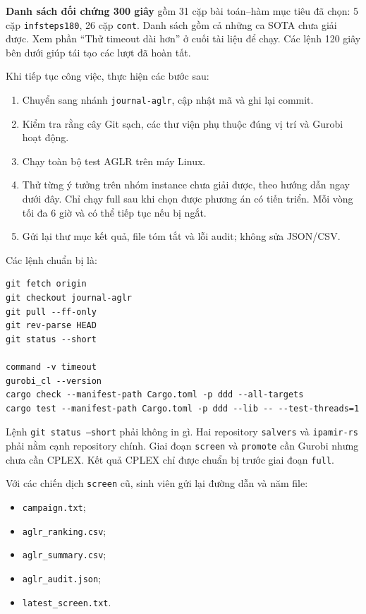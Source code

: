 \documentclass[11pt,a4paper]{article}
\newcommand{\code}[1]{\texttt{#1}}
\newcommand{\file}[1]{\nolinkurl{#1}}
\begin{document}
\textbf{Danh sách đối chứng 300 giây} gồm 31 cặp bài toán--hàm mục tiêu đã chọn:
5 cặp \code{infsteps180}, 26 cặp \code{cont}. Danh sách gồm cả những ca SOTA
chưa giải được. Xem phần ``Thử timeout dài hơn'' ở cuối tài liệu để chạy.
Các lệnh 120 giây bên dưới giúp tái tạo các lượt đã hoàn tất.

Khi tiếp tục công việc, thực hiện các bước sau:

\begin{enumerate}
\item Chuyển sang nhánh \code{journal-aglr}, cập nhật mã và ghi lại commit.
\item Kiểm tra rằng cây Git sạch, các thư viện phụ thuộc đúng vị trí và Gurobi
      hoạt động.
\item Chạy toàn bộ test AGLR trên máy Linux.
\item Thử từng ý tưởng trên nhóm instance chưa giải được, theo hướng dẫn ngay
      dưới đây. Chỉ chạy full sau khi chọn được phương án có tiến triển.
      Mỗi vòng tối đa 6 giờ và có thể tiếp tục nếu bị ngắt.
\item Gửi lại thư mục kết quả, file tóm tắt và lỗi audit; không sửa JSON/CSV.
\end{enumerate}

Các lệnh chuẩn bị là:

\begin{verbatim}
git fetch origin
git checkout journal-aglr
git pull --ff-only
git rev-parse HEAD
git status --short

command -v timeout
gurobi_cl --version
cargo check --manifest-path Cargo.toml -p ddd --all-targets
cargo test --manifest-path Cargo.toml -p ddd --lib -- --test-threads=1
\end{verbatim}

Lệnh \code{git status --short} phải không in gì. Hai repository
\file{salvers} và \file{ipamir-rs} phải nằm cạnh repository chính. Giai đoạn
\code{screen} và \code{promote} cần Gurobi nhưng chưa cần CPLEX. Kết quả CPLEX
chỉ được chuẩn bị trước giai đoạn \code{full}.

Với các chiến dịch \code{screen} cũ, sinh viên gửi lại đường dẫn và năm file:

\begin{itemize}
\item \file{campaign.txt};
\item \file{aglr_ranking.csv};
\item \file{aglr_summary.csv};
\item \file{aglr_audit.json};
\item \file{latest_screen.txt}.
\end{itemize}
\end{document}

